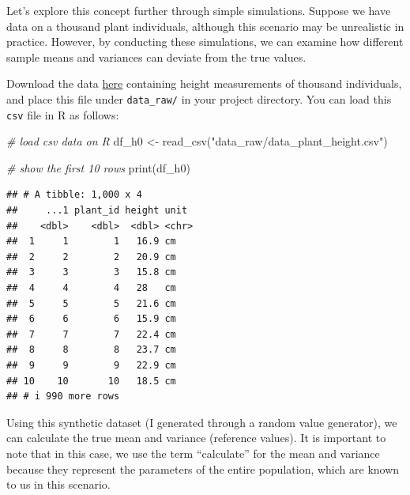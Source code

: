 \documentclass[
]{book}
\newenvironment{Shaded}{\begin{snugshade}}{\end{snugshade}}
\newcommand{\CommentTok}[1]{\textcolor[rgb]{0.56,0.35,0.01}{\textit{#1}}}
\newcommand{\DecValTok}[1]{\textcolor[rgb]{0.00,0.00,0.81}{#1}}
\newcommand{\FunctionTok}[1]{\textcolor[rgb]{0.00,0.00,0.00}{#1}}
\newcommand{\NormalTok}[1]{#1}
\newcommand{\OtherTok}[1]{\textcolor[rgb]{0.56,0.35,0.01}{#1}}
\newcommand{\SpecialCharTok}[1]{\textcolor[rgb]{0.00,0.00,0.00}{#1}}
\newcommand{\StringTok}[1]{\textcolor[rgb]{0.31,0.60,0.02}{#1}}
\begin{document}
Let's explore this concept further through simple simulations. Suppose we have data on a thousand plant individuals, although this scenario may be unrealistic in practice. However, by conducting these simulations, we can examine how different sample means and variances can deviate from the true values.

Download the data \href{https://github.com/aterui/biostats/blob/master/data_raw/data_plant_height.csv}{here} containing height measurements of thousand individuals, and place this file under \texttt{data\_raw/} in your project directory. You can load this \texttt{csv} file in R as follows:

\begin{Shaded}
\begin{Highlighting}[]
\CommentTok{\# load csv data on R}
\NormalTok{df\_h0 }\OtherTok{\textless{}{-}} \FunctionTok{read\_csv}\NormalTok{(}\StringTok{"data\_raw/data\_plant\_height.csv"}\NormalTok{)}

\CommentTok{\# show the first 10 rows}
\FunctionTok{print}\NormalTok{(df\_h0)}
\end{Highlighting}
\end{Shaded}

\begin{verbatim}
## # A tibble: 1,000 x 4
##     ...1 plant_id height unit 
##    <dbl>    <dbl>  <dbl> <chr>
##  1     1        1   16.9 cm   
##  2     2        2   20.9 cm   
##  3     3        3   15.8 cm   
##  4     4        4   28   cm   
##  5     5        5   21.6 cm   
##  6     6        6   15.9 cm   
##  7     7        7   22.4 cm   
##  8     8        8   23.7 cm   
##  9     9        9   22.9 cm   
## 10    10       10   18.5 cm   
## # i 990 more rows
\end{verbatim}

Using this synthetic dataset (I generated through a random value generator), we can calculate the true mean and variance (reference values). It is important to note that in this case, we use the term ``calculate'' for the mean and variance because they represent the parameters of the entire population, which are known to us in this scenario.

\begin{Shaded}
\end{Shaded}
\end{document}
